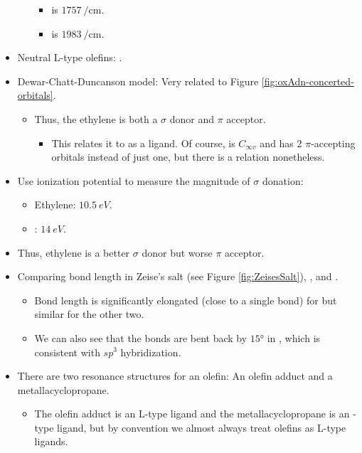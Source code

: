 \documentclass[../notes.tex]{subfiles}
\begin{document}
\begin{itemize}
\begin{itemize}
        \begin{itemize}
            \item {} is $\SI{1757}{\per\centi\meter}$.
            \item {} is $\SI{1983}{\per\centi\meter}$.
        \end{itemize}
    \end{itemize}
    \item Neutral L-type olefins: .
    \item Dewar-Chatt-Duncanson model: Very related to Figure \ref{fig:oxAdn-concerted-orbitals}.
    \begin{itemize}
        \item Thus, the ethylene is both a $\sigma$ donor and $\pi$ acceptor.
        \begin{itemize}
            \item This relates it to  as a ligand. Of course,  is $C_{\infty v}$ and  has 2 $\pi$-accepting orbitals instead of just one, but there is a relation nonetheless.
        \end{itemize}
    \end{itemize}
    \item Use ionization potential to measure the magnitude of $\sigma$ donation:
    \begin{itemize}
        \item Ethylene: $\SI{10.5}{eV}$.
        \item {}: $\SI{14}{eV}$.
    \end{itemize}
    \item Thus, ethylene is a better $\sigma$ donor but worse $\pi$ acceptor.
    \item Comparing  bond length in Zeise's salt (see Figure \ref{fig:ZeisesSalt}), , and .
    \begin{itemize}
        \item Bond length is significantly elongated (close to a  single bond) for  but similar for the other two.
        \item We can also see that the  bonds are bent back by $\ang{15}$ in , which is consistent with $sp^3$ hybridization.
    \end{itemize}
    \item There are two resonance structures for an olefin: An olefin adduct and a metallacyclopropane.
    \begin{itemize}
        \item The olefin adduct is an L-type ligand and the metallacyclopropane is an -type ligand, but by convention we almost always treat olefins as L-type ligands.

\end{itemize}
\end{itemize}
\end{document}
